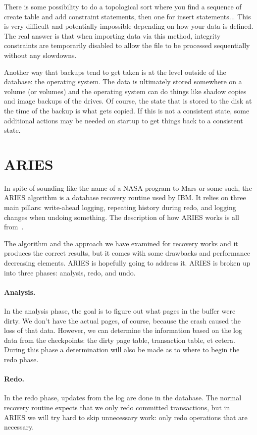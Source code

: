 There is some possibility to do a topological sort where you find a sequence of create table and add constraint statements, then one for insert statements... This is very difficult and potentially impossible depending on how your data is defined. The real answer is that when importing data via this method, integrity constraints are temporarily disabled to allow the file to be processed sequentially without any slowdowns.

Another way that backups tend to get taken is at the level outside of the database: the operating system. The data is ultimately stored somewhere on a volume (or volumes) and the operating system can do things like shadow copies and image backups of the drives. Of course, the state that is stored to the disk at the time of the backup is what gets copied. If this is not a consistent state, some additional actions may be needed on startup to get things back to a consistent state.

\section*{ARIES}
In spite of sounding like the name of a NASA program to Mars or some such, the ARIES algorithm is a database recovery routine used by IBM. It relies on three main pillars: write-ahead logging, repeating history during redo, and logging changes when undoing something. The description of how ARIES works is all from~\cite{fds}.

The algorithm and the approach we have examined for recovery works and it produces the correct results, but it comes with some drawbacks and performance decreasing elements. ARIES is hopefully going to address it. ARIES is broken up into three phases: analysis, redo, and undo.

\paragraph{Analysis.} In the analysis phase, the goal is to figure out what pages in the buffer were dirty. We don't have the actual pages, of course, because the crash caused the loss of that data. However, we can determine the information based on the log data from the checkpoints: the dirty page table, transaction table, et cetera. During this phase a determination will also be made as to where to begin the redo phase.

\paragraph{Redo.} In the redo phase, updates from the log are done in the database. The normal recovery routine expects that we only redo committed transactions, but in ARIES we will try hard to skip unnecessary work: only redo operations that are necessary.

